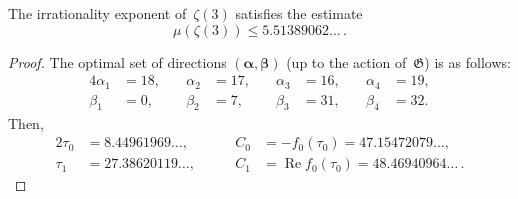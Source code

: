 \documentclass[a4paper,twoside]{article}
\numberwithin{equation}{section}
\renewcommand{\[}{\lfloor}
\renewcommand{\]}{\rfloor}
\newcommand{\<}{\langle}
\renewcommand{\>}{\rangle}
\DeclareMathOperator{\Real}{Re}
\renewcommand{\Re}{\Real}
\newcommand{\balpha}{\boldsymbol\alpha}
\newcommand{\bbeta}{\boldsymbol\beta}
\newcommand{\fG}{\mathfrak G}
\begin{document}
\begin{theorem}
\label{th:1}
The irrationality exponent of~$\zeta(3)$ satisfies the estimate
\begin{equation}
\mu(\zeta(3))\le5.51389062\dots\,.
\label{eq:5.11}
\end{equation}
\end{theorem}

\begin{proof}
The optimal set of directions $(\balpha,\bbeta)$
(up to the action of~$\fG$) is as follows:
\begin{equation}
\begin{alignedat}{4}{4}
\alpha_1&=18, \quad& \alpha_2&=17, \quad&
\alpha_3&=16, \quad& \alpha_4&=19,
\\
\beta_1&=0, \quad& \beta_2&=7, \quad&
\beta_3&=31, \quad& \beta_4&=32.
\end{alignedat}
\label{eq:5.12}
\end{equation}
Then,
\begin{alignat*}{2}
\tau_0&=8.44961969\dots,
\qquad&
C_0&=-f_0(\tau_0)=47.15472079\dots,
\\
\tau_1&=27.38620119\dots,
\qquad&
C_1&=\Re f_0(\tau_0)=48.46940964\dots\,.
\end{alignat*}


\end{proof}
\end{document}
